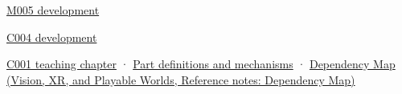 \hyperref[01-foundations-i-ch001-when-arithmetic-meets-uncertainty]{M005 development}

\hyperref[01-foundations-i-ch001-a-stretching-ruler-for-real-valued-quantities]{C004 development}

\hyperref[01-foundations-i-ch001-from-a-signal-to-an-interpretation]{C001 teaching chapter} · \hyperref[appendix-fd090d982a15]{Part definitions and mechanisms} · \href{../07-Vision-XR-and-Playable-Worlds/main.pdf\#nameddest=appendix-4ad47bdd269a}{Dependency Map (Vision, XR, and Playable Worlds, Reference notes: Dependency Map)}

